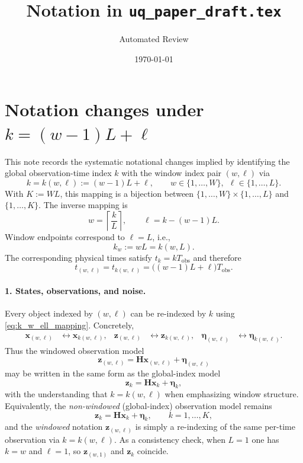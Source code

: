 \documentclass[11pt]{article}
\title{Notation in \texttt{uq\_paper\_draft.tex}}
\author{Automated Review}
\date{\today}
\begin{document}
\section*{Notation changes under $k=(w-1)L+\ell$}

This note records the systematic notational changes implied by identifying the global observation-time index $k$ with the window index pair $(w,\ell)$ via
\begin{equation}
k=k(w,\ell):=(w-1)L+\ell,
\qquad
w\in\{1,\ldots,W\},\ \ \ell\in\{1,\ldots,L\}.
\label{eq:k_w_ell_mapping}
\end{equation}
With $K:=WL$, this mapping is a bijection between $\{1,\ldots,W\}\times\{1,\ldots,L\}$ and $\{1,\ldots,K\}$.
The inverse mapping is
\begin{equation}
w=\left\lceil \frac{k}{L}\right\rceil,
\qquad
\ell=k-(w-1)L.
\label{eq:w_ell_from_k}
\end{equation}
Window endpoints correspond to $\ell=L$, i.e.,
\begin{equation}
k_w:=wL=k(w,L).
\label{eq:k_window_endpoint}
\end{equation}
The corresponding physical times satisfy $t_k=kT_{\mathrm{obs}}$ and therefore
\[
t_{(w,\ell)}=t_{k(w,\ell)}=\bigl((w-1)L+\ell\bigr)T_{\mathrm{obs}}.
\]

\paragraph{1. States, observations, and noise.}
Every object indexed by $(w,\ell)$ can be re-indexed by $k$ using \eqref{eq:k_w_ell_mapping}. Concretely,
\begin{align}
\mathbf{x}_{(w,\ell)} &\longleftrightarrow \mathbf{x}_{k(w,\ell)}, &
\mathbf{z}_{(w,\ell)} &\longleftrightarrow \mathbf{z}_{k(w,\ell)}, &
\boldsymbol{\eta}_{(w,\ell)} &\longleftrightarrow \boldsymbol{\eta}_{k(w,\ell)}.
\label{eq:pair_to_k_basic}
\end{align}
Thus the windowed observation model
\[
\mathbf{z}_{(w,\ell)}=\mathbf{H}\mathbf{x}_{(w,\ell)}+\boldsymbol{\eta}_{(w,\ell)}
\]
may be written in the same form as the global-index model
\[
\mathbf{z}_{k}=\mathbf{H}\mathbf{x}_{k}+\boldsymbol{\eta}_{k},
\]
with the understanding that $k=k(w,\ell)$ when emphasizing window structure.
Equivalently, the \emph{non-windowed} (global-index) observation model remains
\[
\mathbf{z}_{k}=\mathbf{H}\mathbf{x}_{k}+\boldsymbol{\eta}_{k},
\qquad k=1,\ldots,K,
\]
and the \emph{windowed} notation $\mathbf{z}_{(w,\ell)}$ is simply a re-indexing of the same per-time observation via $k=k(w,\ell)$. As a consistency check, when $L=1$ one has $k=w$ and $\ell=1$, so $\mathbf{z}_{(w,1)}$ and $\mathbf{z}_{k}$ coincide.
\end{document}
